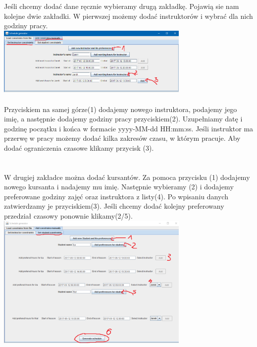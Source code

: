\documentclass{article}
\begin{document}
\newpage
\par
Jeśli chcemy dodać dane ręcznie wybieramy drugą zakładkę. Pojawią sie nam kolejne dwie zakładki. W pierwszej możemy dodać instruktorów i wybrać dla nich godziny pracy.\\
\includegraphics[width=0.7\textwidth]{screen-inst.png} \\ \\ 
Przyciskiem na samej górze(1) dodajemy nowego instruktora, podajemy jego imię, a następnie dodajemy godziny pracy przyciskiem(2). Uzupełniamy datę i godzinę początku i końca w formacie yyyy-MM-dd HH:mm:ss. Jeśli instruktor ma przerwę w pracy możemy dodać kilka zakresów czasu, w którym pracuje. Aby dodać ograniczenia czasowe klikamy przycisk (3). \\ \\ \\



W drugiej zakładce można dodać kursantów. Za pomoca przycisku (1) dodajemy nowego kursanta i nadajemy mu imię. Następnie wybieramy (2) i dodajemy preferowane godziny zajęć oraz instruktora z listy(4). Po wpisaniu danych zatwierdzamy je przyciskiem(3). Jeśli chcemy dodać kolejny preferowany przedział czasowy ponownie klikamy(2/5). \\ 
\includegraphics[width=0.7\textwidth]{screen-stud.png} \\ \\ 
\end{document}
